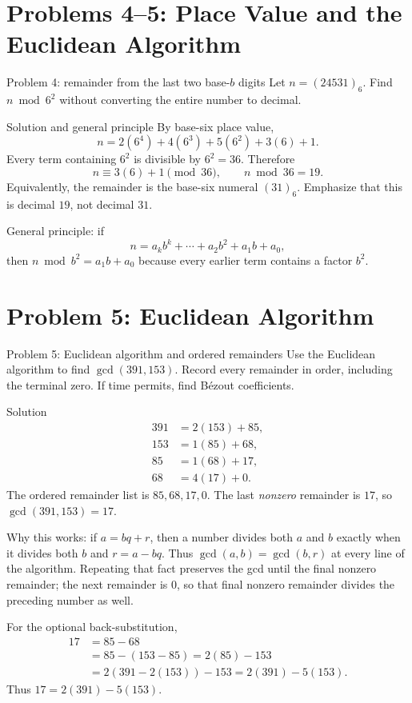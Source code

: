 \documentclass[10pt]{article}
\begin{document}
\thispagestyle{fancy}
\clearpage
\pagestyle{fancy}
\thispagestyle{fancy}
\section*{Problems 4--5: Place Value and the Euclidean Algorithm}

\begin{promptbox}{Problem 4: remainder from the last two base-$b$ digits}
Let $n=(24531)_6$. Find $n\bmod6^2$ without converting the entire number to
decimal.
\end{promptbox}

\begin{solutionbox}{Solution and general principle}
By base-six place value,
\[
n=2(6^4)+4(6^3)+5(6^2)+3(6)+1.
\]
Every term containing $6^2$ is divisible by $6^2=36$. Therefore
\[
n\equiv3(6)+1\pmod{36},\qquad n\bmod36=19.
\]
Equivalently, the remainder is the base-six numeral $(31)_6$. Emphasize that
this is decimal $19$, not decimal $31$.

General principle: if
\[
n=a_kb^k+\cdots+a_2b^2+a_1b+a_0,
\]
then $n\bmod b^2=a_1b+a_0$ because every earlier term contains a factor
$b^2$.
\end{solutionbox}

\section*{Problem 5: Euclidean Algorithm}

\begin{promptbox}{Problem 5: Euclidean algorithm and ordered remainders}
Use the Euclidean algorithm to find $\gcd(391,153)$. Record every remainder
in order, including the terminal zero. If time permits, find B\'ezout
coefficients.
\end{promptbox}

\begin{solutionbox}{Solution}
\[
\begin{aligned}
391&=2(153)+85,\\
153&=1(85)+68,\\
85&=1(68)+17,\\
68&=4(17)+0.
\end{aligned}
\]
The ordered remainder list is $85,68,17,0$. The last \emph{nonzero}
remainder is $17$, so $\gcd(391,153)=17$.

Why this works: if $a=bq+r$, then a number divides both $a$ and $b$ exactly
when it divides both $b$ and $r=a-bq$. Thus
$\gcd(a,b)=\gcd(b,r)$ at every line of the algorithm. Repeating that fact
preserves the gcd until the final nonzero remainder; the next remainder is
$0$, so that final nonzero remainder divides the preceding number as well.

For the optional back-substitution,
\[
\begin{aligned}
17&=85-68\\
&=85-(153-85)=2(85)-153\\
&=2(391-2(153))-153=2(391)-5(153).
\end{aligned}
\]
Thus $17=2(391)-5(153)$.
\end{solutionbox}
\end{document}
